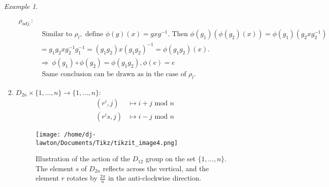 \documentclass{article}
\theoremstyle{definition}
\theoremstyle{remark}
\newtheorem*{example}{Example}
\begin{document}
\begin{example}
\begin{enumerate}
\begin{align*}
			      \rho_{adj.}: &                                                                                                                                    \\
			                   & \text{ Similar to }\rho_l, \text{ define } \phi(g)(x)=gxg^{-1}. \text{ Then } \phi(g_1)(\phi(g_2)(x))=\phi(g_1)(g_2xg_2^{-1})      \\&=g_1g_2xg_2^{-1}g_1^{-1}=(g_1g_2)x(g_1g_2)^{-1}=\phi(g_1g_2)(x).\\
			                   & \Rightarrow ~\phi(g_1)\circ\phi(g_2)=\phi(g_1g_2), \phi(e)=e                                                                       \\
			                   & \text{ Same conclusion can be drawn as in the case of } \rho_l.
		      \end{align*}
		\item $D_{2n}\times\lbrace1,...,n\rbrace\rightarrow\lbrace1,...,n\rbrace:$
		      \begin{align*}
			      (r^i,j)  & \mapsto i+j \text{ mod }n \\
			      (r^is,j) & \mapsto i-j\text{ mod }n
		      \end{align*}
		      \begin{figure}[H]
			      \begin{center}
				      \texttt{[image: /home/dj-lawton/Documents/Tikz/tikzit\_image4.png]}
				      \caption{\label{fig: Dihedral}Illustration of the action of the $D_{12}$ group on the set $\lbrace 1,...,n\rbrace$. The element $s$ of $D_{2n}$ reflects across the vertical, and the element $r$ rotates by $\frac{2\pi}{n}$ in the anti-clockwise direction. }
			      \end{center}
		      \end{figure}
	\end{enumerate}
\end{example}
\newpage
\end{document}
